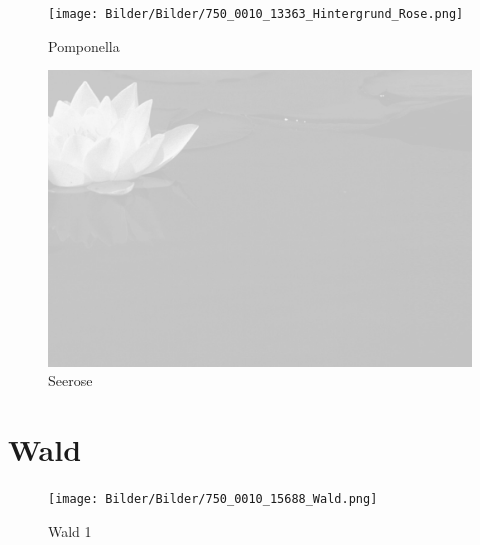 \documentclass[ngerman,a4paper,11pt]{scrreprt}
\begin{document}
\begin{figure}[H]
\centering
\texttt{[image: Bilder/Bilder/750\_0010\_13363\_Hintergrund\_Rose.png]}
\caption{\label{img_Pomponella}Pomponella}
\end{figure}

\begin{figure}[H]
\centering
\includegraphics[width=\textwidth,height=.8\textheight,keepaspectratio]{Bilder/Bilder/750_0010_13964_1070679_Hintergrund_mit_Seerose.png}
\caption{\label{img_Seerose}Seerose}
\end{figure}

\chapter{Wald}
\label{sec-3-3}

\begin{figure}[H]
\centering
\texttt{[image: Bilder/Bilder/750\_0010\_15688\_Wald.png]}
\caption{\label{img_Wald_1}Wald 1}
\end{figure}
\end{document}
